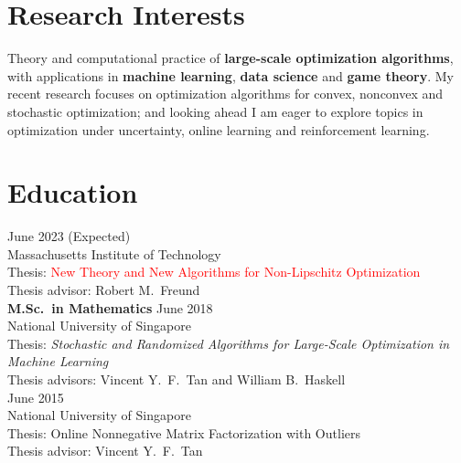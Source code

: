 \documentclass[11pt]{article}
\begin{document}
\section*{\large Research Interests}

\noindent Theory and computational practice of {\bf large-scale optimization algorithms}, with applications in {\bf machine learning}, {\bf data science} and {\bf game theory}.  My recent  research focuses on optimization algorithms for  convex, nonconvex and stochastic optimization; and looking ahead I am eager to explore topics in optimization under uncertainty, online learning and reinforcement learning. 



\section*{\large Education}


 \hfill June 2023 (Expected)\\
{Massachusetts Institute of Technology} \\ %
{Thesis}: \textcolor{red}{New Theory and New Algorithms for Non-Lipschitz Optimization} \\
{ Thesis advisor}: {Robert M.\ Freund}\\

{\noindent \bf M.Sc.\ in Mathematics}  \hfill June 2018\\
  {National University of Singapore}\\
{ Thesis}: {\em Stochastic and Randomized Algorithms for Large-Scale Optimization in Machine Learning} \\
{ Thesis advisors}: {Vincent Y.\ F.\ Tan and William B.\ Haskell}\\


 \hfill June 2015\\
{National University of Singapore} \\   %
{ Thesis}: {Online Nonnegative Matrix Factorization with Outliers}\\%
{ Thesis advisor}: {Vincent Y.\ F.\ Tan}

\end{document}
